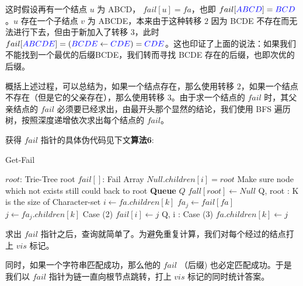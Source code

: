 \documentclass[UTF8]{ctexart}
\begin{document}
\begin{itemize}
	这时假设再有一个结点 $u$ 为 \textcolor[rgb]{0,0,1}{ABCD}， $fail[u]=fa$，也即 $fail[\textcolor[rgb]{0,0,1}{ABCD}]=\textcolor[rgb]{0,0,1}{BCD}$。$u$ 存在一个子结点 $v$ 为 \textcolor[rgb]{0,0,1}{ABCDE}，本来由于这种转移 $2$ 因为 \textcolor[rgb]{0,0,1}{BCDE} 不存在而无法进行下去，但由于新加入了转移 $3$，此时 $fail[\textcolor[rgb]{0,0,1}{ABCDE}] = (\textcolor[rgb]{0,0,1}{BCDE} \gets \textcolor[rgb]{0,0,1}{CDE}) = \textcolor[rgb]{0,0,1}{CDE}$。这也印证了上面的说法：如果我们不能找到一个最优的后缀\textcolor[rgb]{0,0,1}{BCDE}，我们转而寻找 \textcolor[rgb]{0,0,1}{BCDE} 存在的后缀，也即次优的后缀。

\end{itemize}

概括上述过程，可以总结为，如果一个结点存在，那么使用转移 $2$，如果一个结点不存在（但是它的父亲存在），那么使用转移 $3$。由于求一个结点的 $fail$ 时，其父亲结点的 $fail$ 必须要已经求出，由最开头那个显然的结论，我们使用 BFS 遍历树，按照深度递增依次求出每个结点的 $fail$。 \par

获得 $fail$ 指针的具体伪代码见下文\textbf{算法6}:

\begin{algorithm}
\caption{Get-Fail}  
\label{alg: Aho-Corasick Automaton Get-Fail} 
\begin{algorithmic} [1] 
	\Require $root$: Trie-Tree root
	\Ensure $fail[]$: Fail Array
			\State $Null.children[i] = root$ Make sure node which not exists still could back to root 
		\EndFor
		\State \textbf{Queue} $Q$
		\State $fall[root] \gets Null$
		\State {} {Q, root}
			\State {}
			 : K is the size of Character-set
				\State $i \gets fa.children[k]$
				\State $fa_j \gets fail[fa]$
				\State $j \gets fa_j.children[k]$
				 Case (2)
					\State $fail[i] \gets j$
					\State {} {Q, i}
				\Else: Case (3)
					\State $fa.children[k] \gets j$
				\EndIf
			\EndFor
		\EndWhile
	\EndFunction  
\end{algorithmic}
\end{algorithm}

求出 $fail$ 指针之后，查询就简单了。为避免重复计算，我们对每个经过的结点打上 $vis$ 标记。

同时，如果一个字符串匹配成功，那么他的 $fail$ （后缀) 也必定匹配成功。于是我们以 $fail$ 指针为链一直向根节点跳转，打上 $vis$ 标记的同时统计答案。
\end{document}
